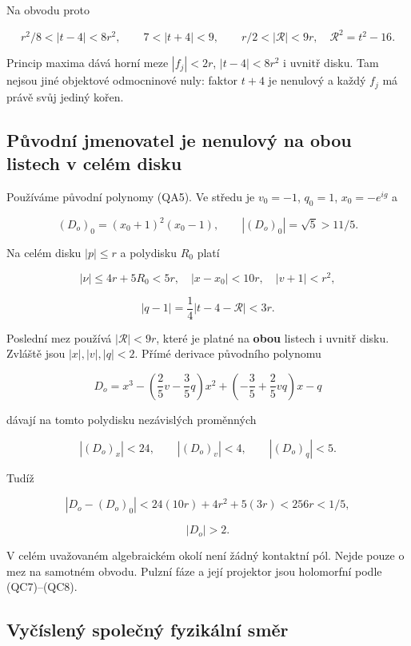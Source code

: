 \documentclass[11pt,a4paper]{article}
\theoremstyle{remark}\newtheorem{remark}[theorem]{Poznámka}
\numberwithin{equation}{section}
\begin{document}
Na obvodu proto

\[
r^2/8<|t-4|<8r^2,
\qquad 7<|t+4|<9,
\qquad r/2<|\mathcal R|<9r,
\quad \mathcal R^2=t^2-16.
\tag{QC15}
\]

Princip maxima dává horní meze \(|f_j|<2r\), \(|t-4|<8r^2\) i uvnitř
disku. Tam nejsou jiné objektové odmocninové nuly: faktor \(t+4\) je
nenulový a každý \(f_j\) má právě svůj jediný kořen.

\hypertarget{pux16fvodnuxed-jmenovatel-je-nenulovuxfd-na-obou-listech-v-celuxe9m-disku}{%
\subsection{Původní jmenovatel je nenulový na obou listech v celém
disku}\label{pux16fvodnuxed-jmenovatel-je-nenulovuxfd-na-obou-listech-v-celuxe9m-disku}}

Používáme původní polynomy (QA5). Ve středu je \(v_0=-1\), \(q_0=1\),
\(x_0=-e^{ig}\) a

\[
(D_o)_0=(x_0+1)^2(x_0-1),\qquad
|(D_o)_0|=\sqrt5>11/5.
\tag{QC16}
\]

Na celém disku \(|p|\le r\) a polydisku \(R_0\) platí

\[
|\nu|\le4r+5R_0<5r,\quad
|x-x_0|<10r,\quad |v+1|<r^2,
\]

\[
|q-1|=\frac14|t-4-\mathcal R|<3r.
\tag{QC17}
\]

Poslední mez používá \(|\mathcal R|<9r\), které je platné na
\textbf{obou} listech i uvnitř disku. Zvláště jsou \(|x|,|v|,|q|<2\).
Přímé derivace původního polynomu

\[
D_o=x^3-\left(\frac25v-\frac35q\right)x^2
+\left(-\frac35+\frac25vq\right)x-q
\]

dávají na tomto polydisku nezávislých proměnných

\[
|(D_o)_x|<24,\qquad |(D_o)_v|<4,\qquad |(D_o)_q|<5.
\]

Tudíž

\[
|D_o-(D_o)_0|<24(10r)+4r^2+5(3r)<256r<1/5,
\]

\[
\boxed{|D_o|>2.}
\tag{QC18}
\]

V celém uvažovaném algebraickém okolí není žádný kontaktní pól. Nejde
pouze o mez na samotném obvodu. Pulzní fáze a její projektor jsou
holomorfní podle (QC7)--(QC8).

\hypertarget{vyux10duxedslenuxfd-spoleux10dnuxfd-fyzikuxe1lnuxed-smux11br}{%
\subsection{Vyčíslený společný fyzikální
směr}\label{vyux10duxedslenuxfd-spoleux10dnuxfd-fyzikuxe1lnuxed-smux11br}}
\end{document}
